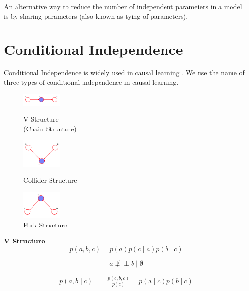 \documentclass{article}
\def\ci{\perp\!\!\!\perp}
\begin{document}
An alternative way to reduce the number of independent parameters in a model is by sharing parameters (also known as tying of parameters).
\section{Conditional Independence}
Conditional Independence is widely used in causal learning \cite{pearl2016causal}. We use the name of three types of conditional independence in causal learning.
\begin{figure}[!htb]
    \centering
    \begin{minipage}[t]{0.32\textwidth}
        \centering
        \includegraphics[width=2cm]{./images/2021-09-15-17-49-28.png}
        \caption{V-Structure \\ (Chain Structure)}
    \end{minipage}
    \begin{minipage}[t]{0.32\textwidth}
        \centering
        \includegraphics[width=2cm]{./images/2021-09-15-17-43-00.png}
        \caption{Collider Structure} 
    \end{minipage}
    \begin{minipage}[t]{0.32\textwidth}
        \centering
        \includegraphics[width=2cm]{./images/2021-09-15-17-43-54.png}
        \caption{Fork Structure}
    \end{minipage}
\end{figure}

\newpage
\textbf{V-Structure}
\begin{equation}
    p(a, b, c)=p(a) p(c \mid a) p(b \mid c)
\end{equation}

\begin{equation}
    a \not \ci b \mid \emptyset
\end{equation}

\begin{equation}
    \begin{aligned}
    p(a, b \mid c) &=\frac{p(a, b, c)}{p(c)} =p(a \mid c) p(b \mid c)
    \end{aligned}
\end{equation}
\end{document}
